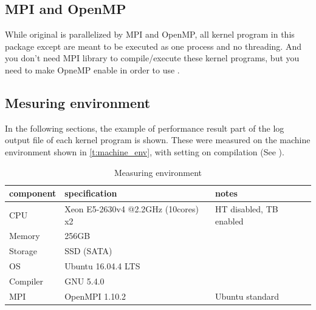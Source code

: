 \subsection{MPI and OpenMP}\label{s:mpi_openmpi}

While original \NICAM is parallelized by MPI and OpenMP,
all kernel program in this package except 
are meant to be executed as one process and no threading.
%
And you don't need MPI library to compile/execute these kernel programs,
but you need to make OpneMP enable in order to use .

\subsection{Mesuring environment}\label{s:measuring_env}

In the following sections, the example of performance result part of the
log output file of each kernel program is shown.
%
These were measured on the machine environment shown in
\autoref{t:machine_env},
with setting  on compilation 
(See ).


\begin{table}[htbp]
\centering
\caption{Measuring environment}\label{t:machine_env}
\small
\begin{tabularx}{.8\textwidth}{llX}
\hline
component & specification & notes \\ 
\hline
 CPU & Xeon E5-2630v4 @2.2GHz (10cores) x2 & HT disabled, TB enabled\\
 Memory & 256GB &\\
 Storage & SSD (SATA) &\\
 OS & Ubuntu 16.04.4 LTS &\\
 Compiler & GNU 5.4.0 & \\
 MPI & OpenMPI 1.10.2 & Ubuntu standard \\
\hline
\end{tabularx} 
\end{table}



